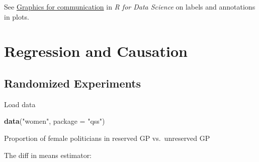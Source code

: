 \documentclass[]{book}
\newenvironment{Shaded}{\begin{snugshade}}{\end{snugshade}}
\newcommand{\CommentTok}[1]{\textcolor[rgb]{0.56,0.35,0.01}{\textit{#1}}}
\newcommand{\DataTypeTok}[1]{\textcolor[rgb]{0.13,0.29,0.53}{#1}}
\newcommand{\DecValTok}[1]{\textcolor[rgb]{0.00,0.00,0.81}{#1}}
\newcommand{\KeywordTok}[1]{\textcolor[rgb]{0.13,0.29,0.53}{\textbf{#1}}}
\newcommand{\NormalTok}[1]{#1}
\newcommand{\OperatorTok}[1]{\textcolor[rgb]{0.81,0.36,0.00}{\textbf{#1}}}
\newcommand{\StringTok}[1]{\textcolor[rgb]{0.31,0.60,0.02}{#1}}
\theoremstyle{definition}
\theoremstyle{definition}
\theoremstyle{definition}
\theoremstyle{remark}
\begin{document}
See
\href{http://r4ds.had.co.nz/graphics-for-communication.html\#label}{Graphics
for communication} in \emph{R for Data Science} on labels and
annotations in plots.

\hypertarget{regression-and-causation}{%
\section{Regression and Causation}\label{regression-and-causation}}

\hypertarget{randomized-experiments}{%
\subsection{Randomized Experiments}\label{randomized-experiments}}

Load data

\begin{Shaded}
\begin{Highlighting}[]
\KeywordTok{data}\NormalTok{(}\StringTok{"women"}\NormalTok{, }\DataTypeTok{package =} \StringTok{"qss"}\NormalTok{)}
\end{Highlighting}
\end{Shaded}

Proportion of female politicians in reserved GP vs.~unreserved GP

\begin{Shaded}
\end{Shaded}

The diff in means estimator:

\begin{Shaded}
\end{Shaded}
\end{document}
